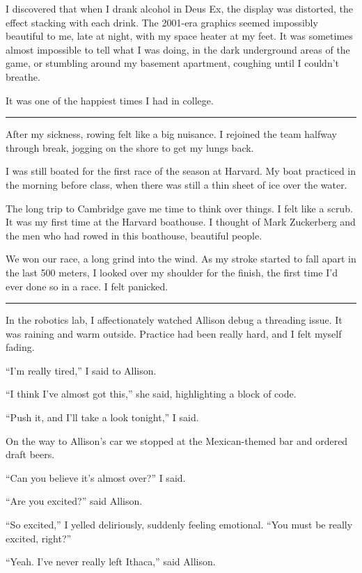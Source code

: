 I discovered that when I drank alcohol in Deus Ex, the display was distorted,
the effect stacking with each drink.  The 2001-era graphics seemed impossibly
beautiful to me, late at night, with my space heater at my feet.  It was
sometimes almost impossible to tell what I was doing, in the dark underground
areas of the game, or stumbling around my basement apartment, coughing until I
couldn't breathe.

It was one of the happiest times I had in college.

\plainfancybreak{12pt}{2}{}

After my sickness, rowing felt like a big nuisance.  I rejoined the team halfway
through break, jogging on the shore to get my lungs back.  

I was still boated for the first race of the season at Harvard.  My boat
practiced in the morning before class, when there was still a thin sheet of ice
over the water.

The long trip to Cambridge gave me time to think over things.  I felt like a
scrub.  It was my first time at the Harvard boathouse.  I thought of Mark
Zuckerberg and the men who had rowed in this boathouse, beautiful people. 

We won our race, a long grind into the wind.  As my stroke started to fall apart
in the last 500 meters, I looked over my shoulder for the finish, the first time
I'd ever done so in a race.  I felt panicked.

\plainfancybreak{12pt}{2}{}

In the robotics lab, I affectionately watched Allison debug a threading issue.
It was raining and warm outside.  Practice had been really hard, and I felt
myself fading.

``I'm really tired,'' I said to Allison.

``I think I've almost got this,'' she said, highlighting a block of code.

``Push it, and I'll take a look tonight,'' I said.

On the way to Allison's car we stopped at the Mexican-themed bar and ordered
draft beers.

``Can you believe it's almost over?'' I said.

``Are you excited?'' said Allison.

``So excited,'' I yelled deliriously, suddenly feeling emotional.  ``You must be
really excited, right?''

``Yeah.  I've never really left Ithaca,'' said Allison.

